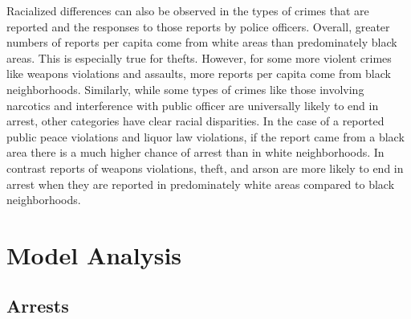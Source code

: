 \documentclass{ucetd}
\begin{document}
Racialized differences can also be observed in the types of crimes that
are reported and the responses to those reports by police officers.
Overall, greater numbers of reports per capita come from white areas
than predominately black areas. This is especially true for thefts.
However, for some more violent crimes like weapons violations and
assaults, more reports per capita come from black neighborhoods.
Similarly, while some types of crimes like those involving narcotics and
interference with public officer are universally likely to end in
arrest, other categories have clear racial disparities. In the case of a
reported public peace violations and liquor law violations, if the
report came from a black area there is a much higher chance of arrest
than in white neighborhoods. In contrast reports of weapons violations,
theft, and arson are more likely to end in arrest when they are reported
in predominately white areas compared to black neighborhoods.

\hypertarget{model-analysis}{%
\section{Model Analysis}\label{model-analysis}}

\hypertarget{arrests}{%
\subsection{Arrests}\label{arrests}}
\end{document}
